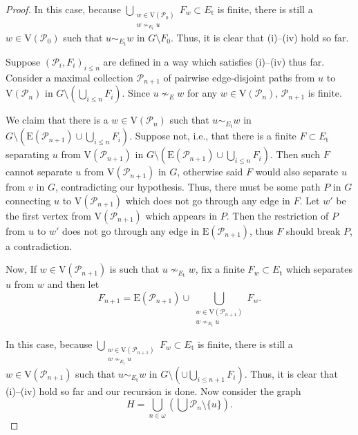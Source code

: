\documentclass[10pt]{article}
\numberwithin{equation}{subsection}
\theoremstyle{remark}
\begin{document}
\begin{proof}
    
    In this case, because $\bigcup_{\substack{w\in \mathrm{V}(\mathcal P_0)\\w\nsim_{E_\mathrm{t}}u}}F_w\subset E_\mathrm{t}$ is finite, there is still a $w\in \mathrm{V}(\mathcal P_0)$ such that $u\sim_{E_\mathrm{t}} w$ in $G\setminus F_0$. Thus, it is clear that (i)--(iv) hold so far.

    Suppose $(\mathcal P_i,F_i)_{i\le n}$  are defined in a way which satisfies (i)--(iv) thus far. Consider a maximal collection $\mathcal P_{n+1}$ of pairwise edge-disjoint paths from $u$ to $\mathrm{V}(\mathcal P_n)$ in $G\setminus \left(\bigcup_{i\le n}F_i\right)$. Since $u\nsim_E w$ for any $w\in \mathrm{V}(\mathcal P_n)$, $\mathcal P_{n+1}$ is finite. 

    
    We claim that there is a $w\in \mathrm{V}(\mathcal P_n)$ such that $u\sim_{E_\mathrm{t}} w$ in $G\setminus \left(\mathrm{E}(\mathcal P_{n+1})\cup\bigcup_{i\le n}F_i\right)$. Suppose not, i.e., that there is a finite $F\subset E_\mathrm{t}$ separating $u$ from $\mathrm{V}(\mathcal P_{n+1})$ in $G\setminus \left(\mathrm{E}(\mathcal P_{n+1})\cup\bigcup_{i\le n}F_i\right)$. Then such $F$ cannot separate $u$ from $\mathrm{V}(\mathcal P_{n+1})$ in $G$, otherwise said $F$ would also separate $u$ from $v$ in $G$, contradicting our hypothesis. Thus, there must be some path $P$ in $G$ connecting $u$ to $\mathrm{V}(\mathcal P_{n+1})$ which does not go through any edge in $F$. Let $w'$ be the first vertex from $\mathrm{V}(\mathcal P_{n+1})$ which appears in $P$. Then the restriction of $P$ from $u$ to $w'$ does not go through any edge in $\mathrm{E}(\mathcal P_{n+1})$, thus $F$ should break $P$, a contradiction. 
    
    Now, If $w\in \mathrm{V}(\mathcal P_{n+1})$ is such that $u\nsim_{E_\mathrm{t}}w$, fix a finite $F_w\subset E_\mathrm{t}$ which separates $u$ from $w$ and then let
    \[
      F_{n+1} = \mathrm{E}(\mathcal P_{n+1})\cup \bigcup_{\substack{w\in \mathrm{V}(\mathcal P_{n+1})\\w\nsim_{E_\mathrm{t}}u}}F_w.
    \]

    In this case, because $\bigcup_{\substack{w\in \mathrm{V}(\mathcal P_{n+1})\\w\nsim_{E_\mathrm{t}}u}}F_w\subset E_\mathrm{t}$ is finite, there is still a $w\in \mathrm{V}(\mathcal P_{n+1})$ such that $u\sim_{E_\mathrm{t}} w$ in $G\setminus \left(\cup\bigcup_{i\le n+1}F_i\right)$. Thus, it is clear that (i)--(iv) hold so far and our recursion is done. Now consider the graph 
    \[
        H = \bigcup_{n\in\omega}\left(\bigcup\mathcal P_n\setminus \{u\}\right).
    \]
    

\end{proof}
\end{document}
